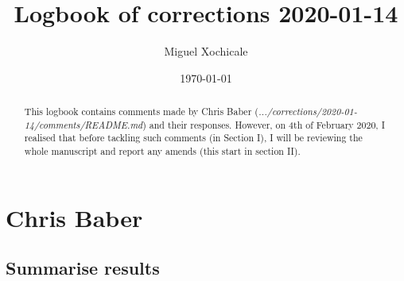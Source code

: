 \documentclass[10pt]{article}
\title{
Logbook of corrections 2020-01-14 
}
\author{Miguel Xochicale}
\date{ \today }
\begin{document}
\maketitle

\begin{abstract}
This logbook contains comments made by Chris Baber 
(\emph{.../corrections/2020-01-14/comments/README.md})
and their responses. 
However, on 4th of February 2020, I realised 
that before tackling such comments (in Section I),
I will be reviewing the whole manuscript and report 
any amends (this start in section II).
\end{abstract}

\tableofcontents

\section{Chris Baber}
\subsection{Summarise results}
\end{document}
